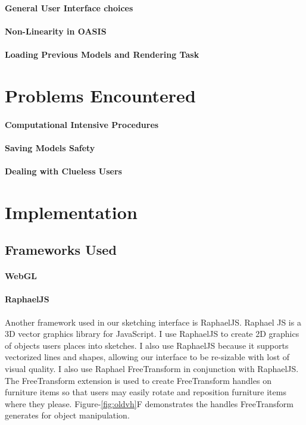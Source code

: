 \paragraph{General User Interface choices}
\paragraph{Non-Linearity in OASIS}
\paragraph{Loading Previous Models and Rendering Task}

\section{Problems Encountered}
\paragraph{Computational Intensive Procedures}
\paragraph{Saving Models Safety}
\paragraph{Dealing with Clueless Users}

\section{Implementation}

\subsection{Frameworks Used}
\paragraph{WebGL}
\paragraph{RaphaelJS}
Another framework used in our sketching interface is RaphaelJS\cite{todo}.
Raphael JS is a 3D vector graphics library for JavaScript. 
I use RaphaelJS to create 2D graphics of objects users places into sketches. I also use RaphaelJS because it supports vectorized lines and shapes, allowing our interface  to be re-sizable with lost of visual quality.
I also use Raphael FreeTransform in conjunction with RaphaelJS\cite{todo}. 
The FreeTransform extension is used to create FreeTransform handles on furniture items so that users may easily rotate and reposition furniture items where they please.
Figure-\ref{fig:oldvh}F demonstrates the handles FreeTransform generates for object manipulation.\\



